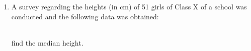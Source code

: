 \renewcommand{\theequation}{\theenumi}
\begin{enumerate}[label=\arabic*.,ref=\thesubsection.\theenumi]
\item A survey regarding the heights (in cm) of 51 girls of Class X of a school was conducted and the following data was obtained:
\begin{table}[!ht]
	\centering
	
\end{table}\\

find the median height.
\end{enumerate}

